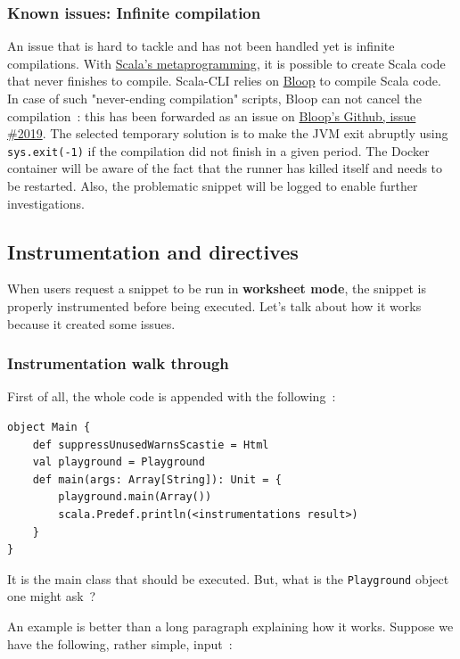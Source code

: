 \documentclass{article}
\begin{document}
\subsubsection{Known issues: Infinite compilation}

An issue that is hard to tackle and has not been handled yet is infinite compilations. With \href{https://docs.scala-lang.org/scala3/reference/metaprogramming/index.html}{Scala's metaprogramming}, it is possible to create Scala code that never finishes to compile. Scala-CLI relies on \href{https://scalacenter.github.io/bloop/}{Bloop} to compile Scala code. In case of such "never-ending compilation" scripts, Bloop can not cancel the compilation~: this has been forwarded as an issue on \href{https://github.com/scalacenter/bloop/issues/2019}{Bloop's Github, issue \#2019}. The selected temporary solution is to make the JVM exit abruptly using \lstinline{sys.exit(-1)} if the compilation did not finish in a given period. The Docker container will be aware of the fact that the runner has killed itself and needs to be restarted. Also, the problematic snippet will be logged to enable further investigations.

\subsection{Instrumentation and directives}

When users request a snippet to be run in \textbf{worksheet mode}, the snippet is properly instrumented before being executed. Let's talk about how it works because it created some issues.

\subsubsection{Instrumentation walk through}

First of all, the whole code is appended with the following~:

\begin{lstlisting}
object Main {
    def suppressUnusedWarnsScastie = Html
    val playground = Playground
    def main(args: Array[String]): Unit = {
        playground.main(Array())
        scala.Predef.println(<instrumentations result>)
    }
}
\end{lstlisting}

It is the main class that should be executed. But, what is the \lstinline{Playground} object one might ask~?

An example is better than a long paragraph explaining how it works. Suppose we have the following, rather simple, input~:
\end{document}
